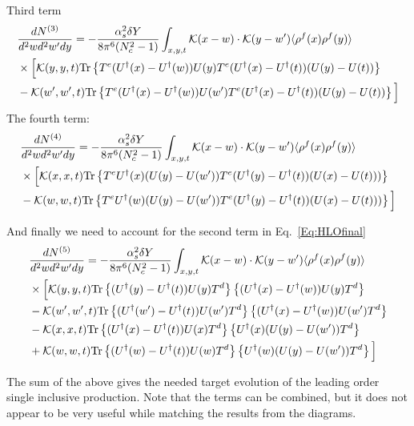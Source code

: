 \documentclass[aps,prd,amsmath,amssymb,nofootinbib]{revtex4-2}
\numberwithin{equation}{section}
\begin{document}
Third term 
\begin{align}
    &\frac{dN^{(3)}}{d^2 w d^2 w' d y} = - \frac{\alpha_s^2 \delta Y}{8 \pi^6 (N_c^2-1)}
\int_{x,y,t} {\cal K}(x-w)\cdot {\cal K}(y-w') \langle\rho^f(x) \rho^f(y) \rangle \notag \\ & \times  
\Big[ 
 {\cal K}(y,y,t) {\rm Tr} \left\{ T^e (U^\dagger(x) - U^\dagger(w)) U(y) T^e ( U^\dagger(x) - U^\dagger(t) )  ( U(y) - U(t) )\right\}
 \notag \\ & -  {\cal K}(w', w',t) {\rm Tr} \left\{ T^e (U^\dagger(x) - U^\dagger(w)) U(w') T^e ( U^\dagger(x) - U^\dagger(t) )  ( U(y) - U(t) )\right\}
\Big] 
\end{align} 
The fourth term:
\begin{align}
    &\frac{dN^{(4)}}{d^2 w d^2 w' d y} = - \frac{\alpha_s^2 \delta Y}{8 \pi^6 (N_c^2-1)}
\int_{x,y,t} {\cal K}(x-w)\cdot {\cal K}(y-w') \langle\rho^f(x) \rho^f(y) \rangle \notag \\ & \times  
\Big[ 
 {\cal K}(x,x,t) {\rm Tr} \left\{ T^e U^\dagger(x) ( U(y) - U(w') ) T^e ( U^\dagger(y) - U^\dagger(t) )  ( U(x) - U(t) ) )\right\}
 \notag \\ & -  {\cal K}(w, w,t) {\rm Tr} \left\{ T^e U^\dagger(w) ( U(y) - U(w') )  T^e ( U^\dagger(y) - U^\dagger(t) )  ( U(x) - U(t) ) )\right\}
\Big] 
\end{align} 


And finally we need to account for the second term in Eq.~\eqref{Eq:HLOfinal} 
\begin{align}
    &\frac{dN^{(5)}}{d^2 w d^2 w' d y} =  -\frac{\alpha_s^2 \delta Y}{8 \pi^6 (N_c^2-1)}
\int_{x,y,t} {\cal K}(x-w)\cdot {\cal K}(y-w') \langle\rho^f(x) \rho^f(y) \rangle \notag \\ & \times  
\Big[ 
 {\cal K}(y,y,t) {\rm Tr} \left\{ (U^\dagger(y) -U^\dagger(t) ) U(y) T^d \right\} \left\{ (U^\dagger(x) -U^\dagger(w) ) U(y) T^d \right\} \notag \\ &
 -  {\cal K}(w',w',t) {\rm Tr} \left\{ (U^\dagger(w') -U^\dagger(t) ) U(w') T^d \right\} \left\{ (U^\dagger(x) -U^\dagger(w) ) U(w') T^d \right\}
\notag \\ &
 -  {\cal K}(x,x,t) {\rm Tr} \left\{ (U^\dagger(x) -U^\dagger(t) ) U(x) T^d \right\} 
 \left\{ U^\dagger(x)  (U(y) - U(w')) T^d \right\}
\notag \\ & 
+ {\cal K}(w,w,t) {\rm Tr} \left\{ (U^\dagger(w) -U^\dagger(t) ) U(w) T^d \right\} 
 \left\{ U^\dagger(w)  (U(y) - U(w')) T^d \right\}
\Big] 
\end{align} 


The sum of the above gives the needed target evolution of the leading order single inclusive production. 
Note that the terms can be combined, but it does not appear to be very useful while matching the results from the diagrams.
\end{document}
